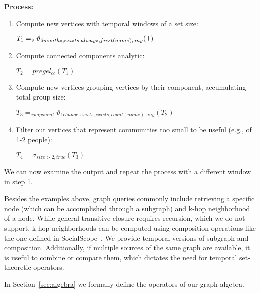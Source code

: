 {\bf Process:} 
\begin{enumerate}[noitemsep]
\item Compute new vertices with temporal windows of a set size:

$T_1 = _v\vartheta_{6 months,exists,always,first(name),any}( \mathsf{T})$

\item Compute connected components analytic:

$T_2 = pregel_{cc} (T_1)$

\item Compute new vertices grouping vertices by their component,
  accumulating total group size:

$T_3 = _{component}\vartheta_{1 change,exists,exists,count(name),any}(T_2)$

\item Filter out vertices that represent communities too small to be
  useful (e.g., of 1-2 people):

$T_4 = \sigma_{size > 2,true}(T_3)$

\end{enumerate}

We can now examine the output and repeat the process with a different
window in step 1.

Besides the examples above, graph queries commonly include retrieving
a specific node (which can be accomplished through a subgraph) and
k-hop neighborhood of a node.  While general transitive closure
requires recursion, which we do not support, k-hop neighborhoods can
be computed using composition operations like the one defined in
SocialScope~\cite{Amer-Yahia2009}.  We provide temporal versions of
subgraph and composition.  Additionally, if multiple sources of the
same graph are available, it is useful to combine or compare them,
which dictates the need for temporal set-theoretic operators.

In Section~\ref{sec:algebra} we formally define the operators of our
graph algebra. 
